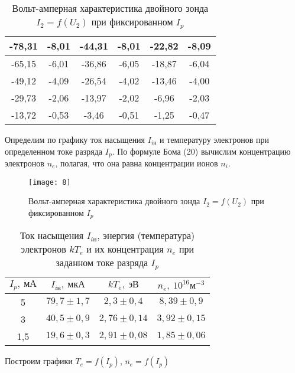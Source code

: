 \begin{table}[H]
\begin{tabular}{|c|c||c|c||c|c|}
-78,31      & -8,01     & -44,31     & -8,01     & -22,82     & -8,09     \\ \hline
-65,15      & -6,01     & -36,86     & -6,05     & -18,87     & -6,04     \\ \hline
-49,12      & -4,09     & -26,54     & -4,02     & -13,46     & -4,00     \\ \hline
-29,73      & -2,06     & -13,97     & -2,02     & -6,96      & -2,03     \\ \hline
-13,72      & -0,53     & -3,46      & -0,51     & -1,25      & -0,47     \\ \hline
\end{tabular}
\captionsetup{justification=centering}
\caption{Вольт-амперная характеристика
двойного зонда $I_2 = f(U_2)$ при
фиксированном $I_p$}
\end{table}

Определим по графику ток насыщения
$I_{i\text{н}}$ и температуру электронов
при определенном токе разряда $I_p$. По
формуле Бома (20) вычислим концентрацию
электронов $n_e$, полагая, что она равна
концентрации ионов $n_i$. 
\begin{figure}[H]
    \texttt{[image: 8]}
    \captionsetup{justification=centering}
    \caption{Вольт-амперная характеристика
двойного зонда $I_2 = f(U_2)$ при
фиксированном $I_p$}
\end{figure}

\begin{table}[H]
    \begin{tabular}{|c|c|c|c|}
        \hline
        $I_p, \ \text{мА}$ &
        $I_{i\text{н}}, \ \text{мкА}$ &
        $kT_e, \ \text{эВ}$ & $n_e,
        \ 10^{16} \text{м}^{-3}$ \\ \hline
        5 & $79,7 \pm 1,7$ & $2,3 \pm
        0,4$ &
        $8,39 \pm 0,9$ \\ \hline
        3 & $40,5 \pm 0,9$ & $2,76 \pm
        0,14$
          & $3,92 \pm 0,15$ \\ \hline
        1,5 & $19,6 \pm 0,3$ & $2,91 \pm
        0,08$ & $1,85 \pm 0,06$ \\ \hline
    \end{tabular}
    \captionsetup{justification=centering}
    \caption{Ток насыщения
    $I_{i\text{н}}$, энергия
(температура) электронов $kT_e$ и их
концентрация $n_e$ при заданном токе
разряда $I_p$}
\end{table}

Построим графики $T_e = f(I_p)$,  $n_e =
f(I_p) $

